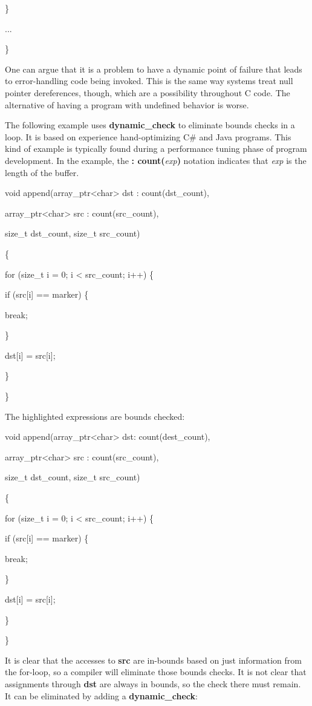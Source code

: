 \documentclass[]{article}
\begin{document}
\}

...

\}

One can argue that it is a problem to have a dynamic point of failure
that leads to error-handling code being invoked. This is the same way
systems treat null pointer dereferences, though, which are a possibility
throughout C code. The alternative of having a program with undefined
behavior is worse.

The following example uses \textbf{dynamic\_check} to eliminate bounds
checks in a loop. It is based on experience hand-optimizing C\# and Java
programs. This kind of example is typically found during a performance
tuning phase of program development. In the example, the \textbf{:
count(}\emph{exp}\textbf{)} notation indicates that \emph{exp} is the
length of the buffer.

void append(array\_ptr\textless{}char\textgreater{} dst :
count(dst\_count),

array\_ptr\textless{}char\textgreater{} src : count(src\_count),

size\_t dst\_count, size\_t src\_count)

\{

for (size\_t i = 0; i \textless{} src\_count; i++) \{

if (src{[}i{]} == marker) \{

break;

\}

dst{[}i{]} = src{[}i{]};

\}

\}

The highlighted expressions are bounds checked:

void append(array\_ptr\textless{}char\textgreater{} dst:
count(dest\_count),

array\_ptr\textless{}char\textgreater{} src : count(src\_count),

size\_t dst\_count, size\_t src\_count)

\{

for (size\_t i = 0; i \textless{} src\_count; i++) \{

if (src{[}i{]} == marker) \{

break;

\}

dst{[}i{]} = src{[}i{]};

\}

\}

It is clear that the accesses to \textbf{src} are in-bounds based on
just information from the for-loop, so a compiler will eliminate those
bounds checks. It is not clear that assignments through \textbf{dst} are
always in bounds, so the check there must remain. It can be eliminated
by adding a \textbf{dynamic\_check}:
\end{document}
